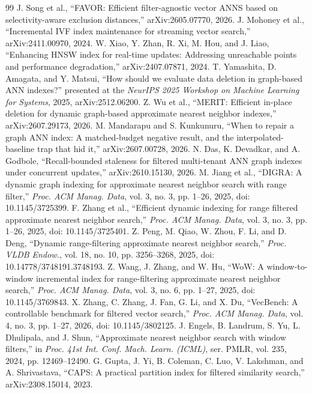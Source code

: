 \documentclass[conference]{IEEEtran}
\begin{document}
\begin{thebibliography}{99}
 J. Song et al., ``FAVOR: Efficient filter-agnostic vector ANNS based on selectivity-aware exclusion distances,'' arXiv:2605.07770, 2026.
 J. Mohoney et al., ``Incremental IVF index maintenance for streaming vector search,'' arXiv:2411.00970, 2024.
 W. Xiao, Y. Zhan, R. Xi, M. Hou, and J. Liao, ``Enhancing HNSW index for real-time updates: Addressing unreachable points and performance degradation,'' arXiv:2407.07871, 2024.
 T. Yamashita, D. Amagata, and Y. Matsui, ``How should we evaluate data deletion in graph-based ANN indexes?'' presented at the \emph{NeurIPS 2025 Workshop on Machine Learning for Systems}, 2025, arXiv:2512.06200.
 Z. Wu et al., ``MERIT: Efficient in-place deletion for dynamic graph-based approximate nearest neighbor indexes,'' arXiv:2607.29173, 2026.
 M. Mandarapu and S. Kunkunuru, ``When to repair a graph ANN index: A matched-budget negative result, and the interpolated-baseline trap that hid it,'' arXiv:2607.00728, 2026.
 N. Das, K. Devadkar, and A. Godbole, ``Recall-bounded staleness for filtered multi-tenant ANN graph indexes under concurrent updates,'' arXiv:2610.15130, 2026.
 M. Jiang et al., ``DIGRA: A dynamic graph indexing for approximate nearest neighbor search with range filter,'' \emph{Proc. ACM Manag. Data}, vol. 3, no. 3, pp. 1--26, 2025, doi: 10.1145/3725399.
 F. Zhang et al., ``Efficient dynamic indexing for range filtered approximate nearest neighbor search,'' \emph{Proc. ACM Manag. Data}, vol. 3, no. 3, pp. 1--26, 2025, doi: 10.1145/3725401.
 Z. Peng, M. Qiao, W. Zhou, F. Li, and D. Deng, ``Dynamic range-filtering approximate nearest neighbor search,'' \emph{Proc. VLDB Endow.}, vol. 18, no. 10, pp. 3256--3268, 2025, doi: 10.14778/3748191.3748193.
 Z. Wang, J. Zhang, and W. Hu, ``WoW: A window-to-window incremental index for range-filtering approximate nearest neighbor search,'' \emph{Proc. ACM Manag. Data}, vol. 3, no. 6, pp. 1--27, 2025, doi: 10.1145/3769843.
 X. Zhang, C. Zhang, J. Fan, G. Li, and X. Du, ``VecBench: A controllable benchmark for filtered vector search,'' \emph{Proc. ACM Manag. Data}, vol. 4, no. 3, pp. 1--27, 2026, doi: 10.1145/3802125.
 J. Engels, B. Landrum, S. Yu, L. Dhulipala, and J. Shun, ``Approximate nearest neighbor search with window filters,'' in \emph{Proc. 41st Int. Conf. Mach. Learn. (ICML)}, ser. PMLR, vol. 235, 2024, pp. 12469--12490.
 G. Gupta, J. Yi, B. Coleman, C. Luo, V. Lakshman, and A. Shrivastava, ``CAPS: A practical partition index for filtered similarity search,'' arXiv:2308.15014, 2023.

\end{thebibliography}
\end{document}
